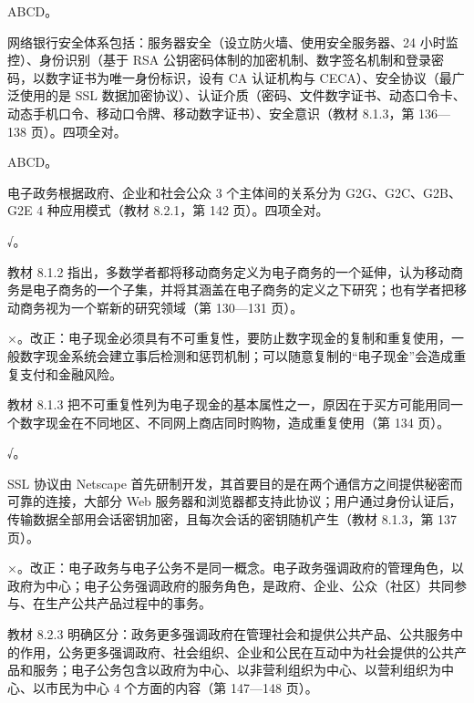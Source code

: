 \documentclass[a4paper,11pt]{article}
\begin{document}
\q ABCD。\begin{analysis}网络银行安全体系包括：服务器安全（设立防火墙、使用安全服务器、24 小时监控）、身份识别（基于 RSA 公钥密码体制的加密机制、数字签名机制和登录密码，以数字证书为唯一身份标识，设有 CA 认证机构与 CECA）、安全协议（最广泛使用的是 SSL 数据加密协议）、认证介质（密码、文件数字证书、动态口令卡、动态手机口令、移动口令牌、移动数字证书）、安全意识（教材 8.1.3，第 136—138 页）。四项全对。\end{analysis}

\q ABCD。\begin{analysis}电子政务根据政府、企业和社会公众 3 个主体间的关系分为 G2G、G2C、G2B、G2E 4 种应用模式（教材 8.2.1，第 142 页）。四项全对。\end{analysis}


\q √。\begin{analysis}教材 8.1.2 指出，多数学者都将移动商务定义为电子商务的一个延伸，认为移动商务是电子商务的一个子集，并将其涵盖在电子商务的定义之下研究；也有学者把移动商务视为一个崭新的研究领域（第 130—131 页）。\end{analysis}

\q ×。改正：电子现金必须具有不可重复性，要防止数字现金的复制和重复使用，一般数字现金系统会建立事后检测和惩罚机制；可以随意复制的“电子现金”会造成重复支付和金融风险。\begin{analysis}教材 8.1.3 把不可重复性列为电子现金的基本属性之一，原因在于买方可能用同一个数字现金在不同地区、不同网上商店同时购物，造成重复使用（第 134 页）。\end{analysis}

\q √。\begin{analysis}SSL 协议由 Netscape 首先研制开发，其首要目的是在两个通信方之间提供秘密而可靠的连接，大部分 Web 服务器和浏览器都支持此协议；用户通过身份认证后，传输数据全部用会话密钥加密，且每次会话的密钥随机产生（教材 8.1.3，第 137 页）。\end{analysis}

\q ×。改正：电子政务与电子公务不是同一概念。电子政务强调政府的管理角色，以政府为中心；电子公务强调政府的服务角色，是政府、企业、公众（社区）共同参与、在生产公共产品过程中的事务。\begin{analysis}教材 8.2.3 明确区分：政务更多强调政府在管理社会和提供公共产品、公共服务中的作用，公务更多强调政府、社会组织、企业和公民在互动中为社会提供的公共产品和服务；电子公务包含以政府为中心、以非营利组织为中心、以营利组织为中心、以市民为中心 4 个方面的内容（第 147—148 页）。\end{analysis}
\end{document}
